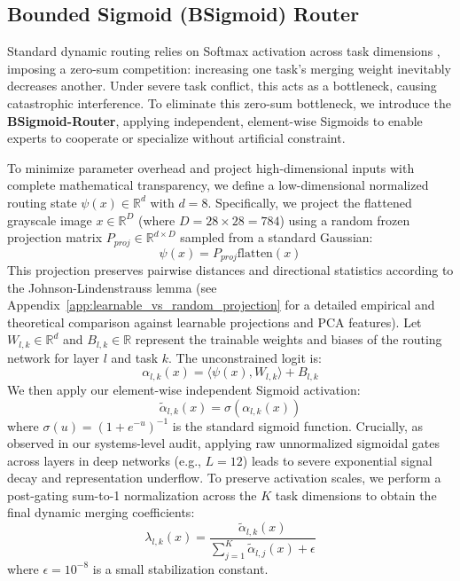 \subsection{Bounded Sigmoid (BSigmoid) Router}

Standard dynamic routing relies on Softmax activation across task dimensions \cite{shazeer2017outrageously}, imposing a zero-sum competition: increasing one task's merging weight inevitably decreases another. Under severe task conflict, this acts as a bottleneck, causing catastrophic interference. To eliminate this zero-sum bottleneck, we introduce the \textbf{BSigmoid-Router}, applying independent, element-wise Sigmoids to enable experts to cooperate or specialize without artificial constraint.

To minimize parameter overhead and project high-dimensional inputs with complete mathematical transparency, we define a low-dimensional normalized routing state $\psi(x) \in \mathbb{R}^d$ with $d=8$. Specifically, we project the flattened grayscale image $x \in \mathbb{R}^D$ (where $D = 28 \times 28 = 784$) using a random frozen projection matrix $P_{proj} \in \mathbb{R}^{d \times D}$ sampled from a standard Gaussian:
\begin{equation}
\psi(x) = P_{proj} \text{flatten}(x)
\end{equation}
This projection preserves pairwise distances and directional statistics according to the Johnson-Lindenstrauss lemma (see Appendix~\ref{app:learnable_vs_random_projection} for a detailed empirical and theoretical comparison against learnable projections and PCA features). Let $W_{l, k} \in \mathbb{R}^d$ and $B_{l, k} \in \mathbb{R}$ represent the trainable weights and biases of the routing network for layer $l$ and task $k$. The unconstrained logit is:
\begin{equation}
\alpha_{l, k}(x) = \langle \psi(x), W_{l, k} \rangle + B_{l, k}
\end{equation}
We then apply our element-wise independent Sigmoid activation:
\begin{equation}
\tilde{\alpha}_{l, k}(x) = \sigma\left(\alpha_{l, k}(x)\right)
\end{equation}
where $\sigma(u) = (1 + e^{-u})^{-1}$ is the standard sigmoid function. Crucially, as observed in our systems-level audit, applying raw unnormalized sigmoidal gates across layers in deep networks (e.g., $L=12$) leads to severe exponential signal decay and representation underflow. To preserve activation scales, we perform a post-gating sum-to-1 normalization across the $K$ task dimensions to obtain the final dynamic merging coefficients:
\begin{equation}
\label{eq:sigmoid_normalization}
\lambda_{l, k}(x) = \frac{\tilde{\alpha}_{l, k}(x)}{\sum_{j=1}^K \tilde{\alpha}_{l, j}(x) + \epsilon}
\end{equation}
where $\epsilon = 10^{-8}$ is a small stabilization constant.

